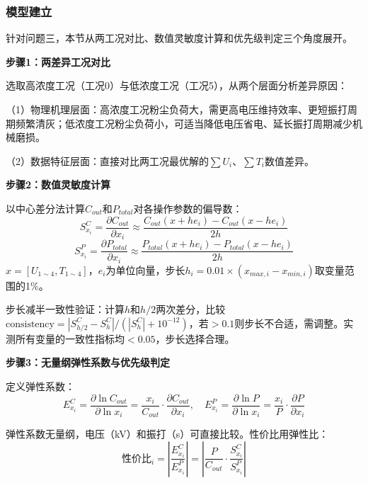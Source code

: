 
\subsubsection{模型建立}

针对问题三，本节从两工况对比、数值灵敏度计算和优先级判定三个角度展开。

\textbf{步骤1：两差异工况对比}

选取高浓度工况（工况0）与低浓度工况（工况5），从两个层面分析差异原因：

（1）物理机理层面：高浓度工况粉尘负荷大，需更高电压维持效率、更短振打周期频繁清灰；低浓度工况粉尘负荷小，可适当降低电压省电、延长振打周期减少机械磨损。

（2）数据特征层面：直接对比两工况最优解的$\sum U_i$、$\sum T_i$数值差异。

\textbf{步骤2：数值灵敏度计算}

以中心差分法计算$C_{out}$和$P_{total}$对各操作参数的偏导数：
\begin{equation}
    S_{x_i}^{C} = \frac{\partial C_{out}}{\partial x_i} \approx \frac{C_{out}(x + h e_i) - C_{out}(x - h e_i)}{2h}
\end{equation}
\begin{equation}
    S_{x_i}^{P} = \frac{\partial P_{total}}{\partial x_i} \approx \frac{P_{total}(x + h e_i) - P_{total}(x - h e_i)}{2h}
\end{equation}
$x=[U_{1\sim4},T_{1\sim4}]$，$e_i$为单位向量，步长$h_i=0.01\times(x_{max,i}-x_{min,i})$取变量范围的1\%。

步长减半一致性验证：计算$h$和$h/2$两次差分，比较$\text{consistency}=|S_{h/2}^C-S_h^C|/(|S_h^C|+10^{-12})$，若$>0.1$则步长不合适，需调整。实测所有变量的一致性指标均$<0.05$，步长选择合理。

\textbf{步骤3：无量纲弹性系数与优先级判定}

定义弹性系数：
\begin{equation}
    E_{x_i}^{C} = \frac{\partial \ln C_{out}}{\partial \ln x_i} = \frac{x_i}{C_{out}}\cdot\frac{\partial C_{out}}{\partial x_i},\quad E_{x_i}^{P} = \frac{\partial \ln P}{\partial \ln x_i} = \frac{x_i}{P}\cdot\frac{\partial P}{\partial x_i}
\end{equation}

弹性系数无量纲，电压（kV）和振打（s）可直接比较。性价比用弹性比：
\begin{equation}
    \text{性价比}_i = \left|\frac{E_{x_i}^{C}}{E_{x_i}^{P}}\right| = \left|\frac{P}{C_{out}}\cdot\frac{S_{x_i}^{C}}{S_{x_i}^{P}}\right|
    \label{eq:cost_effectiveness}
\end{equation}

